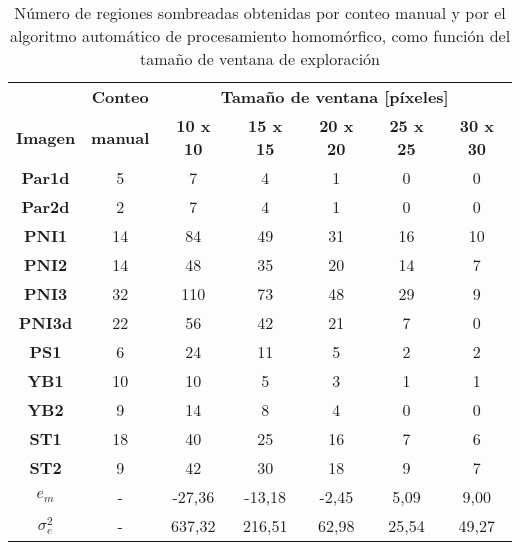 \begin{table}[]
    \centering
    \begin{threeparttable}[b]
        
        \caption{Número de regiones sombreadas obtenidas por conteo manual y por el algoritmo automático de procesamiento homomórfico, como función del tamaño de ventana de exploración}
        \label{tab:resultados_homomorfico}
        \begin{tabular}{ccccccc}
        \hline
        \hline
                  & \textbf{Conteo}  & \multicolumn{5}{c}{\textbf{Tamaño de ventana [píxeles]}}   \\
            \textbf{Imagen}& \textbf{manual}  & \textbf{10 x 10}     & \textbf{15 x 15}     & \textbf{20 x 20 }   & \textbf{25 x 25}    & \textbf{30 x 30 }   \\ \hline
            \textbf{Par1d}  & 5  & 7      & 4      & 1     & 0     & 0     \\
            \textbf{Par2d}  & 2  & 7      & 4      & 1     & 0     & 0     \\
            \textbf{PNI1}   & 14 & 84     & 49     & 31    & 16    & 10    \\
            \textbf{PNI2}   & 14 & 48     & 35     & 20    & 14    & 7     \\
            \textbf{PNI3}   & 32 & 110    & 73     & 48    & 29    & 9     \\
            \textbf{PNI3d}  & 22 & 56     & 42     & 21    & 7     & 0     \\
            \textbf{PS1}    & 6  & 24     & 11     & 5     & 2     & 2     \\ 
            \textbf{YB1}    & 10 & 10     & 5      & 3     & 1     & 1     \\
            \textbf{YB2}    & 9  & 14     & 8      & 4     & 0     & 0     \\
            \textbf{ST1}    & 18 & 40     & 25     & 16    & 7     & 6     \\
            \textbf{ST2}    & 9  & 42     & 30     & 18    & 9     & 7     \\ \hline
            $e_{m}$\tnote{*}    & -  & -27,36 & -13,18 & -2,45 & 5,09  & 9,00  \\ 
            $\sigma^2_{e}$ \tnote{**}   & -  & 637,32  & 216,51 & 62,98 & 25,54 & 49,27 \\

\end{tabular}
\end{threeparttable}
\end{table}
